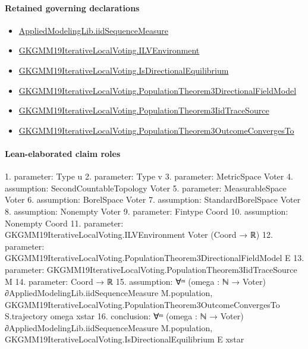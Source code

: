 \documentclass[10pt]{article}
\begin{document}
\paragraph{Retained governing declarations}
\begin{itemize}\raggedright
\item \hyperlink{governing-declaration-f1b1ee19fc287ae5}{Applied\allowbreak{}Modeling\allowbreak{}Lib.\allowbreak{}iid\allowbreak{}Sequence\allowbreak{}Measure}
\item \hyperlink{governing-declaration-df2ca62df1846667}{GKGMM19\allowbreak{}Iterative\allowbreak{}Local\allowbreak{}Voting.\allowbreak{}ILV\allowbreak{}Environment}
\item \hyperlink{governing-declaration-7b0e0510d53784ea}{GKGMM19\allowbreak{}Iterative\allowbreak{}Local\allowbreak{}Voting.\allowbreak{}Is\allowbreak{}Directional\allowbreak{}Equilibrium}
\item \hyperlink{governing-declaration-30327078fcfa0789}{GKGMM19\allowbreak{}Iterative\allowbreak{}Local\allowbreak{}Voting.\allowbreak{}Population\allowbreak{}Theorem3\allowbreak{}Directional\allowbreak{}Field\allowbreak{}Model}
\item \hyperlink{governing-declaration-f8078eb1870f8a52}{GKGMM19\allowbreak{}Iterative\allowbreak{}Local\allowbreak{}Voting.\allowbreak{}Population\allowbreak{}Theorem3\allowbreak{}Iid\allowbreak{}Trace\allowbreak{}Source}
\item \hyperlink{governing-declaration-6fc48a06c8be051b}{GKGMM19\allowbreak{}Iterative\allowbreak{}Local\allowbreak{}Voting.\allowbreak{}Population\allowbreak{}Theorem3\allowbreak{}Outcome\allowbreak{}Converges\allowbreak{}To}
\end{itemize}
\paragraph{Lean-elaborated claim roles}\begin{ReviewVerbatim}
1. parameter: Type u
2. parameter: Type v
3. parameter: MetricSpace Voter
4. assumption: SecondCountableTopology Voter
5. parameter: MeasurableSpace Voter
6. assumption: BorelSpace Voter
7. assumption: StandardBorelSpace Voter
8. assumption: Nonempty Voter
9. parameter: Fintype Coord
10. assumption: Nonempty Coord
11. parameter: GKGMM19IterativeLocalVoting.ILVEnvironment Voter (Coord → ℝ)
12. parameter: GKGMM19IterativeLocalVoting.PopulationTheorem3DirectionalFieldModel E
13. parameter: GKGMM19IterativeLocalVoting.PopulationTheorem3IidTraceSource M
14. parameter: Coord → ℝ
15. assumption: ∀ᵐ (omega : ℕ → Voter) ∂AppliedModelingLib.iidSequenceMeasure M.population,
  GKGMM19IterativeLocalVoting.PopulationTheorem3OutcomeConvergesTo S.trajectory omega xstar
16. conclusion: ∀ᵐ (omega : ℕ → Voter) ∂AppliedModelingLib.iidSequenceMeasure M.population,
  GKGMM19IterativeLocalVoting.IsDirectionalEquilibrium E xstar
\end{ReviewVerbatim}
\end{document}
